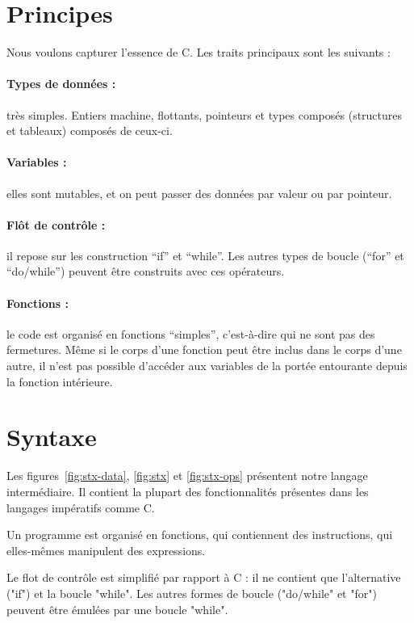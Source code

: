 
\section{Principes}

Nous voulons capturer l'essence de C. Les traits principaux sont les suivants :

\paragraph{Types de données :} très simples. Entiers machine, flottants,
pointeurs et types composés (structures et tableaux) composés de ceux-ci.

\paragraph{Variables :} elles sont mutables, et on peut passer des données par
valeur ou par pointeur.

\paragraph{Flôt de contrôle :} il repose sur les construction ``if'' et
``while''. Les autres types de boucle (``for'' et ``do/while'') peuvent être
construits avec ces opérateurs.

\paragraph{Fonctions :} le code est organisé en fonctions ``simples'',
c'est-à-dire qui ne sont pas des fermetures. Même si le corps
d'une fonction peut être inclus dans le corps d'une autre, il n'est pas possible
d'accéder aux variables de la portée entourante depuis la fonction intérieure.

\section{Syntaxe}

Les figures~\ref{fig:stx-data}, \ref{fig:stx} et \ref{fig:stx-ops} présentent
notre langage intermédiaire. Il contient la plupart des fonctionnalités
présentes dans les langages impératifs comme C.

Un programme est organisé en fonctions, qui contiennent des instructions, qui
elles-mêmes manipulent des expressions.

Le flot de contrôle est simplifié par rapport à C : il ne contient que
l'alternative ("if") et la boucle "while". Les autres formes de boucle
("do/while" et "for") peuvent être émulées par une boucle "while".

